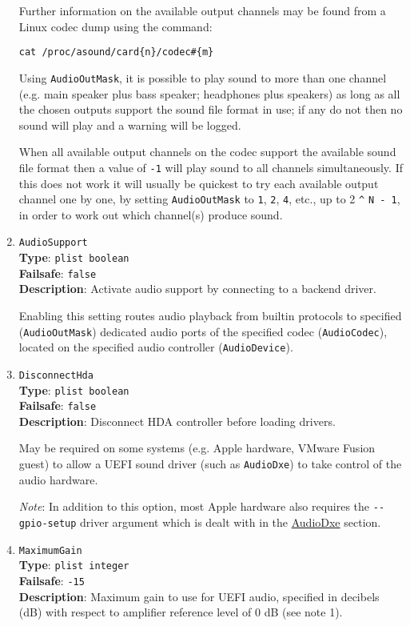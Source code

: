 \documentclass[]{article}
\begin{document}
\begin{enumerate}
  Further information on the available output channels may be found from a Linux codec dump using the command:

  \texttt{cat /proc/asound/card\{n\}/codec\#\{m\}}

  Using \texttt{AudioOutMask}, it is possible to play sound to more than one channel (e.g. main speaker plus bass speaker;
  headphones plus speakers) as long as all the chosen outputs support the sound file format in use; if any do not then no
  sound will play and a warning will be logged.

  When all available output channels on the codec support the available sound file format then a value
  of \texttt{-1} will play sound to all channels simultaneously. If this does not work it will usually be quickest
  to try each available output channel one by one, by setting \texttt{AudioOutMask} to \texttt{1}, \texttt{2},
  \texttt{4}, etc., up to 2 \texttt{\^{}} \texttt{N - 1}, in order to work out which channel(s) produce sound.

  \item
  \texttt{AudioSupport}\\
  \textbf{Type}: \texttt{plist\ boolean}\\
  \textbf{Failsafe}: \texttt{false}\\
  \textbf{Description}: Activate audio support by connecting to a backend driver.

  Enabling this setting routes audio playback from builtin protocols to specified
  (\texttt{AudioOutMask}) dedicated audio ports of the specified codec (\texttt{AudioCodec}),
  located on the specified audio controller (\texttt{AudioDevice}).

  \item
  \texttt{DisconnectHda}\\
  \textbf{Type}: \texttt{plist\ boolean}\\
  \textbf{Failsafe}: \texttt{false}\\
  \textbf{Description}: Disconnect HDA controller before loading drivers.

  May be required on some systems (e.g. Apple hardware, VMware Fusion guest) to allow
  a UEFI sound driver (such as \texttt{AudioDxe}) to take control of the audio hardware.

  \emph{Note}: In addition to this option, most Apple hardware also requires the
  \texttt{-{}-gpio-setup} driver argument which is dealt with in the
  \hyperref[uefiaudio]{AudioDxe} section.

  \item
  \texttt{MaximumGain}\\
  \textbf{Type}: \texttt{plist\ integer}\\
  \textbf{Failsafe}: \texttt{-15}\\
  \textbf{Description}: Maximum gain to use for UEFI audio, specified in decibels (dB) with respect to amplifier
  reference level of 0 dB (see note 1).


\end{enumerate}
\end{document}
